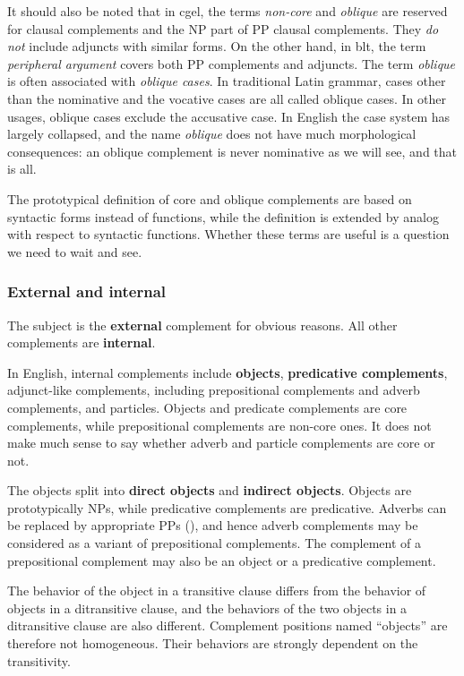 \documentclass{article}
\newcommand*{\concept}[1]{\textbf{#1}}
\newcommand*{\term}[1]{\emph{#1}}
\begin{document}
It should also be noted that in \ac{cgel}, the terms \term{non-core} and \term{oblique} 
are reserved for clausal complements and the NP part of PP clausal complements.
They \emph{do not} include adjuncts with similar forms.
On the other hand, in \ac{blt}, the term \term{peripheral argument} covers both PP complements and adjuncts.
The term \term{oblique} is often associated with \term{oblique cases}.
In traditional Latin grammar, 
cases other than the nominative and the vocative cases are all called oblique cases.
In other usages, oblique cases exclude the accusative case.
In English the case system has largely collapsed,
and the name \term{oblique} does not have much morphological consequences:
an oblique complement is never nominative as we will see, and that is all.

The prototypical definition of core and oblique complements 
are based on syntactic forms instead of functions,
while the definition is extended by analog with respect to syntactic functions.
Whether these terms are useful is a question we need to wait and see.

\subsubsection{External and internal}\label{sec:external-and-internal}

The subject is the \concept{external} complement for obvious reasons.
All other complements are \concept{internal}.

In English, internal complements include \concept{objects}, \concept{predicative complements},
adjunct-like complements, including prepositional complements and adverb complements,
and particles.
Objects and predicate complements are core complements,
while prepositional complements are non-core ones.
It does not make much sense to say whether adverb and particle complements are core or not.

The objects split into \concept{direct objects} and \concept{indirect objects}.
Objects are prototypically NPs, 
while predicative complements are predicative.
Adverbs can be replaced by appropriate PPs (), %
and hence adverb complements may be considered as a variant of prepositional complements.
The complement of a prepositional complement may also be an object or a predicative complement.

The behavior of the object in a transitive clause differs from 
the behavior of objects in a ditransitive clause,
and the behaviors of the two objects in a ditransitive clause are also different.
Complement positions named ``objects'' are therefore not homogeneous.
Their behaviors are strongly dependent on the transitivity.
\end{document}
